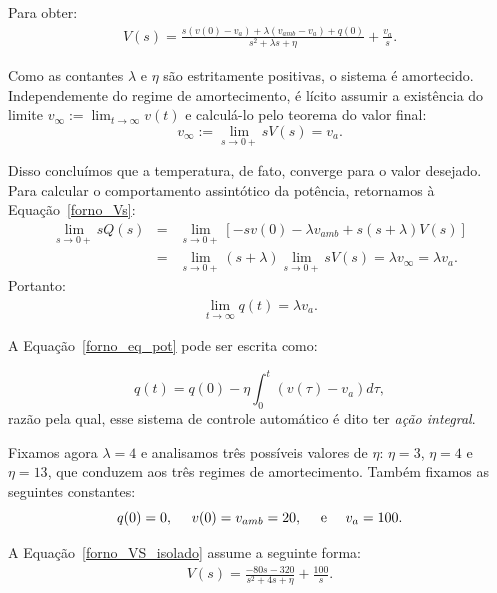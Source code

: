 Para obter:
\begin {eqnarray}
V(s) = \frac{s(v(0)-v_a)+\lambda ({v_{amb}}-v_a) +q(0)}{s^2+\lambda s+\eta} +  \frac{v_a}{s}.\label{forno_VS_isolado}
\end {eqnarray}


Como as contantes $\lambda$ e $\eta$ são estritamente positivas, o sistema é amortecido. Independemente do regime de amortecimento, é lícito assumir a existência do limite $v_\infty:=\lim_{t\to \infty} v(t)$ e calculá-lo pelo teorema do valor final:
$$v_\infty:=\lim_{s\to 0+} sV(s)=v_a.$$

Disso concluímos que a temperatura, de fato, converge para o valor desejado. Para calcular o comportamento assintótico da potência, retornamos à Equação~\ref{forno_Vs}:
\begin{eqnarray*}
\lim_{s\to 0+ }sQ(s) &=& \lim_{s\to 0+ }\left[-sv(0)-\lambda {v_{amb}} + s(s+\lambda)V(s)\right]\\
&=& \lim_{s\to 0+ }(s+\lambda) \lim_{s\to 0+ }sV(s) = \lambda v_\infty = \lambda v_a.
\end{eqnarray*}
Portanto:
\begin{eqnarray*}
 \lim_{t\to \infty }q(t) = \lambda v_a.
\end{eqnarray*} 
       
\begin{obs} A Equação~\ref{forno_eq_pot} pode ser escrita como:
       
$$q(t) = q(0) -\eta \int_0^t \left(v(\tau)-v_a\right)d\tau,$$
razão pela qual, esse sistema de controle automático é dito ter \emph{ação integral}.
\end{obs}

Fixamos agora $\lambda=4$ e analisamos três possíveis valores de $\eta$: $\eta=3$, $\eta=4$ e $\eta= 13$, que conduzem aos três regimes de amortecimento. Também fixamos as seguintes constantes:
$$q(0)=0,~~~~ v(0)=v_{amb}=20, ~~~\hbox{ e }~~~  v_a = 100. $$ 

A Equação~\ref{forno_VS_isolado} assume a seguinte forma:
\begin{eqnarray*}
V(s) = \frac{-80s- 320 }{s^2 + 4 s+\eta} +  \frac{100}{s}.
\end{eqnarray*}

